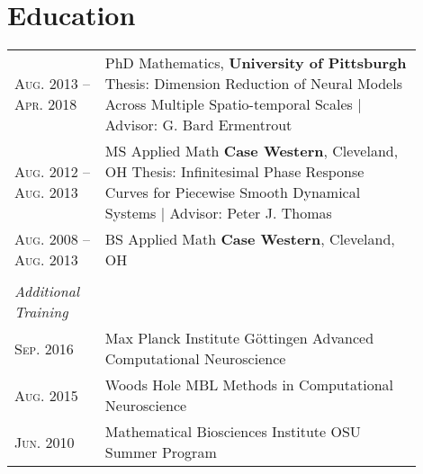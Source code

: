 \documentclass[a4paper,10pt]{article}
\begin{document}
\section{Education}
\begin{tabular}{p{0.2\linewidth}p{0.7\linewidth}}
\textsc{Aug.} 2013 -- \textsc{Apr.} 2018 & PhD Mathematics, \textbf{University of Pittsburgh}\newline
Thesis: Dimension Reduction of Neural Models Across Multiple Spatio-temporal Scales | \small Advisor: G. Bard Ermentrout\vspace{8pt}\\
\textsc{Aug.} 2012 -- \textsc{Aug.} 2013 & MS Applied Math \textbf{Case Western}, Cleveland, OH \newline
Thesis:  Infinitesimal Phase Response Curves for Piecewise Smooth Dynamical Systems | \small Advisor: Peter J. Thomas\vspace{8pt}\\
\textsc{Aug.} 2008 -- \textsc{Aug.} 2013& BS Applied Math \textbf{Case Western}, Cleveland, OH\\
&\\
\textit{Additional Training}\\
\textsc{Sep.} 2016 & Max Planck Institute G{\"o}ttingen Advanced Computational Neuroscience \\
\textsc{Aug.} 2015 & Woods Hole MBL Methods in Computational Neuroscience\\
\textsc{Jun.} 2010 & Mathematical Biosciences Institute OSU Summer Program
\end{tabular}
\end{document}

